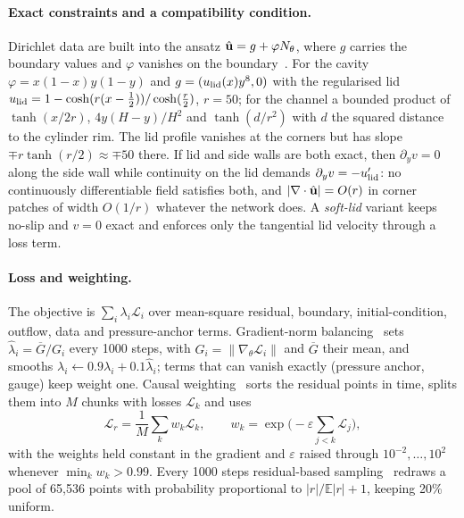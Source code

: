 \paragraph{Exact constraints and a compatibility condition.} Dirichlet data are built into the ansatz
$\hat{\mathbf{u}}=g+\varphi N_\theta$, where $g$ carries the boundary values and $\varphi$ vanishes on the
boundary~\cite{lagaris1998,sukumar2022distance}. For the cavity $\varphi=x(1-x)y(1-y)$ and $g=(u_{\rm lid}(x)y^8,0)$
with the regularised lid $u_{\rm lid}=1-\cosh(r(x-\frac12))/\cosh(\frac r2)$, $r=50$; for the channel a bounded
product of $\tanh(x/2r)$, $4y(H-y)/H^2$ and $\tanh(d/r^2)$ with $d$ the squared distance to the cylinder rim. The
lid profile vanishes at the corners but has slope $\mp r\tanh(r/2)\approx\mp50$ there. If lid and side walls are
both exact, then $\partial_yv=0$ along the side wall while continuity on the lid demands
$\partial_yv=-u'_{\rm lid}$: no continuously differentiable field satisfies both, and $|\nabla\cdot\hat{\mathbf{u}}|=O(r)$ in
corner patches of width $O(1/r)$ whatever the network does. A \emph{soft-lid} variant keeps no-slip and $v=0$ exact
and enforces only the tangential lid velocity through a loss term.

\paragraph{Loss and weighting.} The objective is $\sum_i\lambda_i\mathcal L_i$ over mean-square residual, boundary,
initial-condition, outflow, data and pressure-anchor terms. Gradient-norm balancing~\cite{wang2021gradient,
wang2023expert} sets $\hat\lambda_i=\overline G/G_i$ every 1000 steps, with $G_i=\|\nabla_\theta\mathcal L_i\|$ and
$\overline G$ their mean, and smooths $\lambda_i\leftarrow0.9\lambda_i+0.1\hat\lambda_i$; terms that can vanish
exactly (pressure anchor, gauge) keep weight one. Causal weighting~\cite{wang2024causality} sorts the residual
points in time, splits them into $M$ chunks with losses $\mathcal L_k$ and uses
\begin{equation}
\mathcal L_r=\frac1M\sum_k w_k\mathcal L_k,\qquad w_k=\exp\Big(-\varepsilon\sum_{j<k}\mathcal L_j\Big),
\end{equation}
with the weights held constant in the gradient and $\varepsilon$ raised through $10^{-2},\dots,10^2$ whenever
$\min_kw_k>0.99$. Every 1000 steps residual-based sampling~\cite{wu2023rad} redraws a pool of 65{,}536 points with
probability proportional to $|r|/\mathbb E|r|+1$, keeping 20\% uniform.

